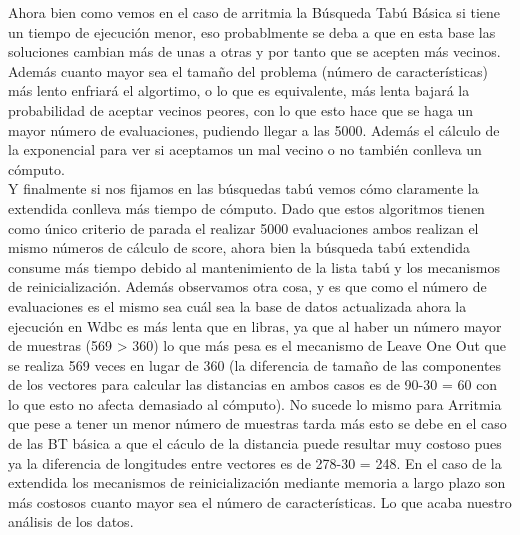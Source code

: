 \documentclass[10pt,a4paper]{article}
\begin{document}
Ahora bien como vemos en el caso de arritmia la Búsqueda Tabú Básica si tiene un tiempo de ejecución menor, eso probablmente se deba a que en esta base las soluciones cambian más de unas a otras y por tanto que se acepten más vecinos. Además cuanto mayor sea el tamaño del problema (número de características) más lento enfriará el algortimo, o lo que es equivalente, más lenta bajará la probabilidad de aceptar vecinos peores, con lo que esto hace que se haga un mayor número de evaluaciones, pudiendo llegar a las 5000. Además el cálculo de la exponencial para ver si aceptamos un mal vecino o no también conlleva un cómputo.\\

Y finalmente si nos fijamos en las búsquedas tabú vemos cómo claramente la extendida conlleva más tiempo de cómputo. Dado que estos algoritmos tienen como único criterio de parada el realizar 5000 evaluaciones ambos realizan  el mismo números de cálculo de score, ahora bien la búsqueda tabú extendida consume más tiempo debido al mantenimiento de la lista tabú y los mecanismos de reinicialización. Además observamos otra cosa, y es que como el número de evaluaciones es el mismo sea cuál sea la base de datos actualizada ahora la ejecución en Wdbc es más lenta que en libras, ya que al haber un número mayor de muestras (569 > 360) lo que más pesa es el mecanismo de Leave One Out que se realiza 569 veces en lugar de 360 (la diferencia de tamaño de las componentes de los vectores para calcular las distancias en ambos casos es de 90-30 = 60 con lo que esto no afecta demasiado al cómputo). No sucede lo mismo para Arritmia que pese a tener un menor número de muestras tarda más esto se debe en el caso de las BT básica a que el cáculo de la distancia puede resultar muy costoso pues ya la diferencia de longitudes entre vectores es de 278-30 = 248. En el caso de la extendida los mecanismos de reinicialización mediante memoria a largo plazo son más costosos cuanto mayor sea el número de características. Lo que acaba nuestro análisis de los datos.
\end{document}
